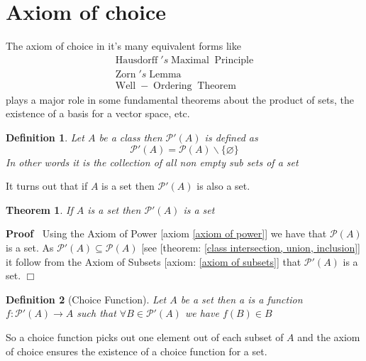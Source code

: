 \documentclass{book}
\newcommand{\tmop}[1]{\ensuremath{\operatorname{#1}}}
\newcommand{\tmtextbf}[1]{\text{{\bfseries{#1}}}}
\newenvironment{proof}{\noindent\textbf{Proof\ }}{\hspace*{\fill}$\Box$\medskip}
\newtheorem{definition}{Definition}
{\theorembodyfont{\rmfamily}\newtheorem{example}{Example}}
\newtheorem{theorem}{Theorem}
\begin{document}
\section{Axiom of choice}

The axiom of choice in it's many equivalent forms like
\begin{eqnarray*}
  & \tmop{Hausdorff}' s \tmop{Maximal} \tmop{Principle} & \\
  & \tmop{Zorn}' s \tmop{Lemma} & \\
  & \tmop{Well} - \tmop{Ordering} \tmop{Theorem} & 
\end{eqnarray*}
plays a major role in some fundamental theorems about the product of sets, the
existence of a basis for a vector space, etc.

\begin{definition}
  \label{choice P'(A)}{}Let $A$ be a class then
  $\mathcal{P}' (A)$ is defined as
  \[ \mathcal{P}' (A) =\mathcal{P} (A) \backslash \{ \varnothing \} \]
  In other words it is the collection of all non empty sub sets of a set
\end{definition}

It turns out that if $A$ is a set then $\mathcal{P}' (A)$ is also a set.

\begin{theorem}
  \label{choice P'(A) is a set}If $A$ is a set then $\mathcal{P}' (A)$ is a
  set
\end{theorem}

\begin{proof}
  Using the Axiom of Power [axiom \ref{axiom of power}] we have that
  $\mathcal{P} (A)$ is a set. As $\mathcal{P}' (A) \subseteq \mathcal{P} (A)$
  [see [theorem: \ref{class intersection, union, inclusion}] it follow from
  the Axiom of Subsets [axiom: \ref{axiom of subsets}] that $\mathcal{P}' (A)$
  is a set.
\end{proof}

\begin{definition}[Choice Function]
  \label{choice choice function}{}Let $A$ be a set then
  a \tmtextbf{choice function for $A$} is a function $f : \mathcal{P}' (A)
  \rightarrow A$ such that $\forall B \in \mathcal{P}' (A)$ we have $f (B) \in
  B$
\end{definition}

So a choice function picks out one element out of each subset of $A$ and the
axiom of choice ensures the existence of a choice function for a set.
\end{document}
